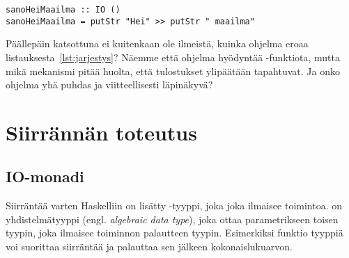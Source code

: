 \documentclass[finnish]{tktltiki2}
\begin{document}
\begin{lstlisting}[float,label={lst:then},caption={Toimiva tulostus}]
sanoHeiMaailma :: IO ()
sanoHeiMaailma = putStr "Hei" >> putStr " maailma"
\end{lstlisting}

Päällepäin katsottuna ei kuitenkaan ole ilmeistä, kuinka ohjelma eroaa
listauksesta~\ref{lst:jarjestys}? Näemme että ohjelma hyödyntää -funktiota, mutta mikä
mekanismi pitää huolta, että tulostukset ylipäätään tapahtuvat. Ja onko ohjelma yhä puhdas ja
viitteellisesti läpinäkyvä?






\section{Siirrännän toteutus}



\subsection{IO-monadi}

Siirräntää varten Haskelliin on lisätty -tyyppi, joka joka ilmaisee toimintoa.  on
yhdistelmätyyppi (engl. \emph{algebraic data type}), joka ottaa parametrikseen toisen tyypin, joka
ilmaisee toiminnon palautteen tyypin. Esimerkiksi funktio tyyppiä  voi suorittaa
siirräntää ja palauttaa sen jälkeen kokonaislukuarvon.
\end{document}
